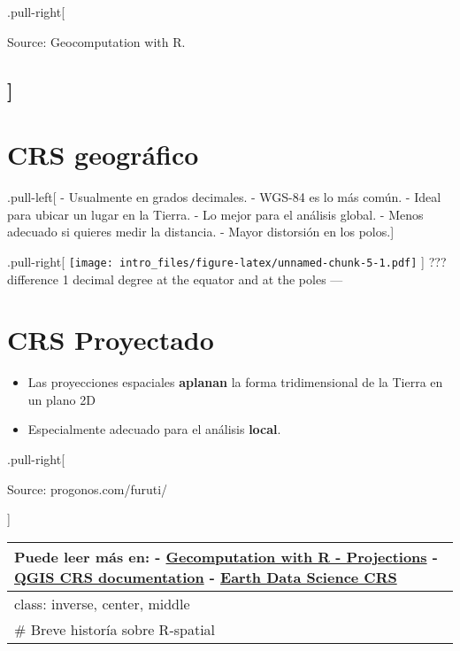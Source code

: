 \documentclass[]{article}
\providecommand{\tightlist}{%
  \setlength{\itemsep}{0pt}\setlength{\parskip}{0pt}}
\begin{document}
.pull-right{[}

Source: Geocomputation with R.

\subsection{{]}}\label{section}

\section{CRS geográfico}\label{crs-geografico-1}

.pull-left{[} - Usualmente en grados decimales. - WGS-84 es lo más
común. - Ideal para ubicar un lugar en la Tierra. - Lo mejor para el
análisis global. - Menos adecuado si quieres medir la distancia. - Mayor
distorsión en los polos.{]}

.pull-right{[}
\texttt{[image: intro\_files/figure-latex/unnamed-chunk-5-1.pdf]} {]} ???
difference 1 decimal degree at the equator and at the poles ---

\section{CRS Proyectado}\label{crs-proyectado}

\begin{itemize}
\tightlist
\item
  Las proyecciones espaciales \textbf{aplanan} la forma tridimensional
  de la Tierra en un plano 2D
\item
  Especialmente adecuado para el análisis \textbf{local}.
\end{itemize}

.pull-right{[}

Source: progonos.com/furuti/

{]}

\begin{longtable}[]{@{}l@{}}
\toprule
\begin{minipage}[b]{0.04\columnwidth}\raggedright\strut
 Puede leer más en: -
\href{https://geocompr.robinlovelace.net/transform.html\#reproj-geo-data}{Gecomputation
with R - Projections} -
\href{https://docs.qgis.org/2.14/en/docs/gentle_gis_introduction/coordinate_reference_systems.html}{QGIS
CRS documentation} -
\href{https://earthdatascience.org/courses/earth-analytics/spatial-data-r/intro-to-coordinate-reference-systems/}{Earth
Data Science CRS}\strut
\end{minipage}\tabularnewline
\midrule
\endhead
\begin{minipage}[t]{0.04\columnwidth}\raggedright\strut
class: inverse, center, middle\strut
\end{minipage}\tabularnewline
\begin{minipage}[t]{0.04\columnwidth}\raggedright\strut
\# Breve historía sobre R-spatial\strut
\end{minipage}\tabularnewline
\bottomrule
\end{longtable}
\end{document}
